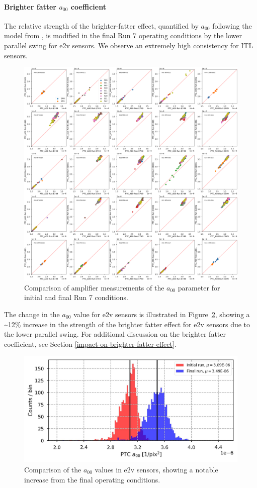 \paragraph{Brighter fatter $a_{00}$ coefficient}\label{final-brighter-fatter-a00-coefficient}

The relative strength of the brighter-fatter effect, quantified by $a_{00}$ following the model from \cite{2019A&A...629A..36A}, is modified in the final Run 7 operating conditions by the lower parallel swing for e2v sensors. We observe an extremely high consistency for ITL sensors.

\begin{figure}[H]
    \centering
    \includegraphics[width=0.7\linewidth]{figures/finalCharacterization/E749_E1881_PTC_A00.png}
    \caption{Comparison of amplifier measurements of the $a_{00}$ parameter for initial and final Run 7 conditions.}
    \label{fig:finalChar-PTC_A00_5x5}
\end{figure}

The change in the $a_{00}$ value for e2v sensors is illustrated in Figure~\ref{fig:finalChar-PTC_A00_E2VComp}, showing a \textasciitilde12\% increase in the strength of the brighter fatter effect for e2v sensors due to the lower parallel swing. For additional discussion on the brighter fatter coefficient, see Section \ref{impact-on-brighter-fatter-effect}.

\begin{figure}[H]
    \centering
    \includegraphics[width=0.7\linewidth]{figures/finalCharacterization/PTCA00Comp.jpg}
    \caption{Comparison of the $a_{00}$ values in e2v sensors, showing a notable increase from the final operating conditions.}
    \label{fig:finalChar-PTC_A00_E2VComp}
\end{figure}

